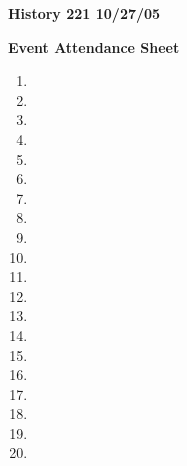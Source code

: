 \documentclass {article}
\begin{document}
\setlength {\parindent}{0in}
\pagestyle {empty}
\textbf {History 221 \hfill 10/27/05}

\begin{center}{\textbf{Event Attendance Sheet}}\end{center}

\begin{multicols}{2}
\begin {enumerate}
\item \dotfill \hspace*{10mm}
\item \dotfill \hspace*{10mm}
\item \dotfill \hspace*{10mm}
\item \dotfill \hspace*{10mm}
\item \dotfill \hspace*{10mm}
\item \dotfill \hspace*{10mm}
\item \dotfill \hspace*{10mm}
\item \dotfill \hspace*{10mm}
\item \dotfill \hspace*{10mm}
\item \dotfill \hspace*{10mm}
\item \dotfill \hspace*{10mm}
\item \dotfill \hspace*{10mm}
\item \dotfill \hspace*{10mm}
\item \dotfill \hspace*{10mm}
\item \dotfill \hspace*{10mm}
\item \dotfill \hspace*{10mm}
\item \dotfill \hspace*{10mm}
\item \dotfill \hspace*{10mm}
\item \dotfill \hspace*{10mm}
\item \dotfill \hspace*{10mm}

\end{enumerate}
\end{multicols}
\end{document}
